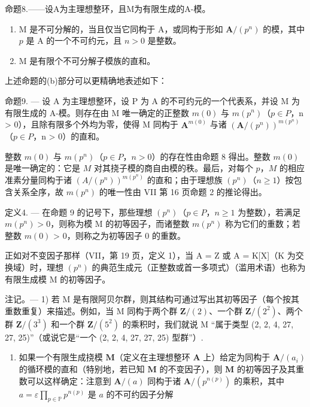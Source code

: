 命题8.——设A为主理想整环，且M为有限生成的A-模。

\begin{enumerate}
\def\labelenumi{\alph{enumi})}
\item
  M 是不可分解的，当且仅当它同构于 A，或同构于形如 \(\mathbf{A} / (p^n)\) 的模，其中 \(p\) 是 A 的一个不可约元，且 \(n > 0\) 是整数。
\item
  M 是有限个不可分解子模族的直和。
\end{enumerate}

上述命题的(b)部分可以更精确地表述如下：

命题9. --- 设 A 为主理想整环，设 P 为 A 的不可约元的一个代表系，并设 M 为有限生成的 A-模。则存在由 M 唯一确定的正整数 \(m(0)\) 与 \(m(p^{n})\)（\(p \in P\)，n \textgreater{} 0），且除有限多个外均为零，使得 M 同构于 \(\mathbf{A}^{m(0)}\) 与诸 \((\mathbf{A}/(p^{n}))^{m(p^{n})}\)（\(p \in P\)，n \textgreater{} 0）的直和。

整数 \(m(0)\) 与 \(m(p^n)\)（\(p \in P\)，\(n > 0\)）的存在性由命题 8 得出。整数 \(m(0)\) 是唯一确定的：它是 \(M\) 对其挠子模的商自由模的秩。最后，对每个 \(p\)，\(M\) 的相应准素分量同构于诸 \((A/(p^n))^{m(p^n)}\) 的直和；由于理想族 \((p^n)\)（\(n \geqslant 1\)）按包含关系全序，故 \(m(p^n)\) 的唯一性由 VII 第 16 页命题 2 的推论得出。

定义4. --- 在命题 9 的记号下，那些理想 \((p^{n})\)（\(p \in P\)，\(n \geqslant 1\) 为整数），若满足 \(m(p^{n}) > 0\)，则称为模 M 的初等因子，而诸整数 \(m(p^{n})\) 称为它们的重数；若整数 \(m(0)\) \textgreater{} 0，则称之为初等因子 0 的重数。

正如对不变因子那样（VII，第 19 页，定义 1），当 A = Z 或 A = K{[}X{]}（K 为交换域）时，理想 \((p^{n})\) 的典范生成元（正整数或首一多项式）（滥用术语）也称为有限生成模 M 的初等因子。

注记。--- 1) 若 M 是有限阿贝尔群，则其结构可通过写出其初等因子（每个按其重数重复）来描述。例如，当 M 同构于两个群 \(\mathbf{Z}/(2)\)、一个群 \(\mathbf{Z}/(2^{2})\)、两个群 \(\mathbf{Z}/(3^{3})\) 和一个群 \(\mathbf{Z}/(5^{2})\) 的乘积时，我们就说 M “属于类型 (2, 2, 4, 27, 27, 25)”（或说它是“一个 (2, 2, 4, 27, 27, 25) 型群”）.

\begin{enumerate}
\def\labelenumi{\arabic{enumi})}
\setcounter{enumi}{1}
\tightlist
\item
  如果一个有限生成挠模 \(\mathbf{M}\)（定义在主理想整环 \(\mathbf{A}\) 上）给定为同构于 \(\mathbf{A} / (a_i)\) 的循环模的直和（特别地，若已知 \(\mathbf{M}\) 的不变因子），则 \(\mathbf{M}\) 的初等因子及其重数可以这样确定：注意到 \(\mathbf{A} / (a)\) 同构于诸 \(\mathbf{A} / (p^{n(p)})\) 的乘积，其中 \(a = \varepsilon \prod_{p \in \mathbb{P}} p^{n(p)}\) 是 \(a\) 的不可约因子分解
\end{enumerate}

